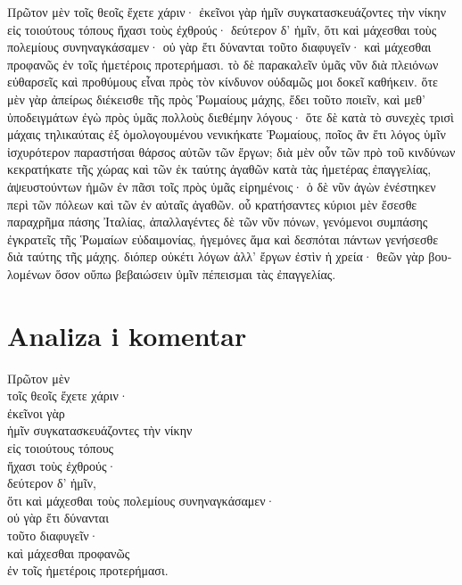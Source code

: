 \medskip

{\large
\begin{greek}
\noindent Πρῶτον μὲν τοῖς θεοῖς ἔχετε χάριν· ἐκεῖνοι γὰρ ἡμῖν συγκατασκευάζοντες τὴν νίκην εἰς τοιούτους τόπους ἤχασι τοὺς ἐχθρούς· δεύτερον δ' ἡμῖν, ὅτι καὶ μάχεσθαι τοὺς πολεμίους συνηναγκάσαμεν· οὐ γὰρ ἔτι δύνανται τοῦτο διαφυγεῖν· καὶ μάχεσθαι προφανῶς ἐν τοῖς ἡμετέροις προτερήμασι. τὸ δὲ παρακαλεῖν ὑμᾶς νῦν διὰ πλειόνων εὐθαρσεῖς καὶ προθύμους εἶναι πρὸς τὸν κίνδυνον οὐδαμῶς μοι δοκεῖ καθήκειν. ὅτε μὲν γὰρ ἀπείρως διέκεισθε τῆς πρὸς Ῥωμαίους μάχης, ἔδει τοῦτο ποιεῖν, καὶ μεθ' ὑποδειγμάτων ἐγὼ πρὸς ὑμᾶς πολλοὺς διεθέμην λόγους· ὅτε δὲ κατὰ τὸ συνεχὲς τρισὶ μάχαις τηλικαύταις ἐξ ὁμολογουμένου νενικήκατε Ῥωμαίους, ποῖος ἂν ἔτι λόγος ὑμῖν ἰσχυρότερον παραστήσαι θάρσος αὐτῶν τῶν ἔργων; διὰ μὲν οὖν τῶν πρὸ τοῦ κινδύνων κεκρατήκατε τῆς χώρας καὶ τῶν ἐκ ταύτης ἀγαθῶν κατὰ τὰς ἡμετέρας ἐπαγγελίας, ἀψευστούντων ἡμῶν ἐν πᾶσι τοῖς πρὸς ὑμᾶς εἰρημένοις· ὁ δὲ νῦν ἀγὼν ἐνέστηκεν περὶ τῶν πόλεων καὶ τῶν ἐν αὐταῖς ἀγαθῶν. οὗ κρατήσαντες κύριοι μὲν ἔσεσθε παραχρῆμα πάσης Ἰταλίας, ἀπαλλαγέντες δὲ τῶν νῦν πόνων, γενόμενοι συμπάσης ἐγκρατεῖς τῆς Ῥωμαίων εὐδαιμονίας, ἡγεμόνες ἅμα καὶ δεσπόται πάντων γενήσεσθε διὰ ταύτης τῆς μάχης. διόπερ οὐκέτι λόγων ἀλλ' ἔργων ἐστὶν ἡ χρεία· θεῶν γὰρ βουλομένων ὅσον οὔπω βεβαιώσειν ὑμῖν πέπεισμαι τὰς ἐπαγγελίας.

\end{greek}
}

\newpage

\section*{Analiza i komentar}


{\large
\begin{greek}
\noindent Πρῶτον μὲν \\
\tabto{2em} τοῖς θεοῖς ἔχετε χάριν·\\
\tabto{4em} ἐκεῖνοι γὰρ \\
\tabto{6em} ἡμῖν συγκατασκευάζοντες τὴν νίκην \\
\tabto{4em} εἰς τοιούτους τόπους \\
\tabto{4em} ἤχασι τοὺς ἐχθρούς·\\
δεύτερον δ' ἡμῖν, \\
\tabto{2em} ὅτι καὶ μάχεσθαι τοὺς πολεμίους συνηναγκάσαμεν·\\
\tabto{4em} οὐ γὰρ ἔτι δύνανται \\
\tabto{6em} τοῦτο διαφυγεῖν·\\
\tabto{6em} καὶ μάχεσθαι προφανῶς \\
\tabto{8em} ἐν τοῖς ἡμετέροις προτερήμασι.\\

\end{greek}
}

